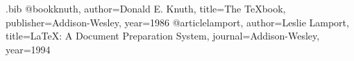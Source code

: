 \begin{filecontents*}[overwrite]{\jobname.bib}
@book{knuth, author={Donald E. Knuth}, title={The {\TeX}book}, publisher={Addison-Wesley}, year={1986}}
@article{lamport, author={Leslie Lamport}, title={{\LaTeX}: A Document Preparation System}, journal={Addison-Wesley}, year={1994}}
\end{filecontents*}
\documentclass{article}
\usepackage[style=authoryear,backend=biber]{biblatex}
\usepackage{csquotes}


As \textcite{knuth} and \textcite{lamport} explain.
\printbibliography

